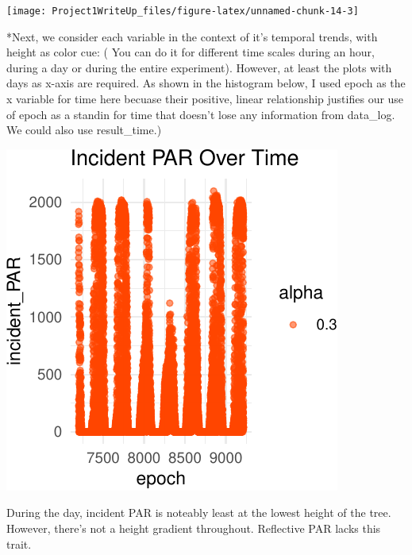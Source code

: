\documentclass[]{article}
\begin{document}
\begin{center}\texttt{[image: Project1WriteUp\_files/figure-latex/unnamed-chunk-14-3]} \end{center}

*Next, we consider each variable in the context of it's temporal trends,
with height as color cue: ( You can do it for different time scales
during an hour, during a day or during the entire experiment). However,
at least the plots with days as x-axis are required. As shown in the
histogram below, I used epoch as the x variable for time here becuase
their positive, linear relationship justifies our use of epoch as a
standin for time that doesn't lose any information from data\_log. We
could also use result\_time.)

\begin{center}\includegraphics{Project1WriteUp_files/figure-latex/unnamed-chunk-15-1} \end{center}

During the day, incident PAR is noteably least at the lowest height of
the tree. However, there's not a height gradient throughout. Reflective
PAR lacks this trait.
\end{document}
